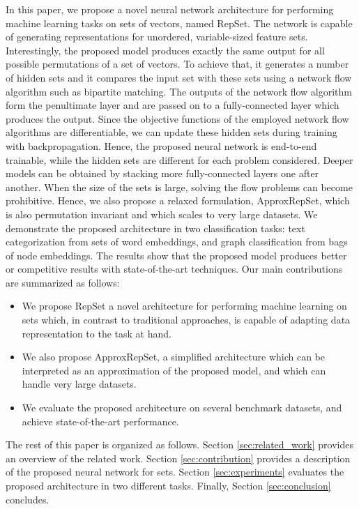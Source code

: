 \documentclass[twoside]{article}
\begin{document}
In this paper, we propose a novel neural network architecture for performing machine learning tasks on sets of vectors, named RepSet.
The network is capable of generating representations for unordered, variable-sized feature sets.
Interestingly, the proposed model produces exactly the same output for all possible permutations of a set of vectors.
To achieve that, it generates a number of hidden sets and it compares the input set with these sets using a network flow algorithm such as bipartite matching.
The outputs of the network flow algorithm form the penultimate layer and are passed on to a fully-connected layer which produces the output.
Since the objective functions of the employed network flow algorithms are differentiable, we can update these hidden sets during training with backpropagation.
Hence, the proposed neural network is end-to-end trainable, while the hidden sets are different for each problem considered.
Deeper models can be obtained by stacking more fully-connected layers one after another.
When the size of the sets is large, solving the flow problems can become prohibitive.
Hence, we also propose a relaxed formulation, ApproxRepSet, which is also permutation invariant and which scales to very large datasets.
We demonstrate the proposed architecture in two classification tasks: text categorization from sets of word embeddings, and graph classification from bags of node embeddings.
The results show that the proposed model produces better or competitive results with state-of-the-art techniques.
Our main contributions are summarized as follows:
\begin{itemize}
    \item We propose RepSet a novel architecture for performing machine learning on sets which, in contrast to traditional approaches, is capable of adapting data representation to the task at hand.
    \item We also propose ApproxRepSet, a simplified architecture which can be interpreted as an approximation of the proposed model, and which can handle very large datasets.
    \item We evaluate the proposed architecture on several benchmark datasets, and achieve state-of-the-art performance.
\end{itemize}

The rest of this paper is organized as follows.
Section \ref{sec:related_work} provides an overview of the related work.
Section \ref{sec:contribution} provides a description of the proposed neural network for sets.
Section \ref{sec:experiments} evaluates the proposed architecture in two different tasks.
Finally, Section \ref{sec:conclusion} concludes.
\end{document}
